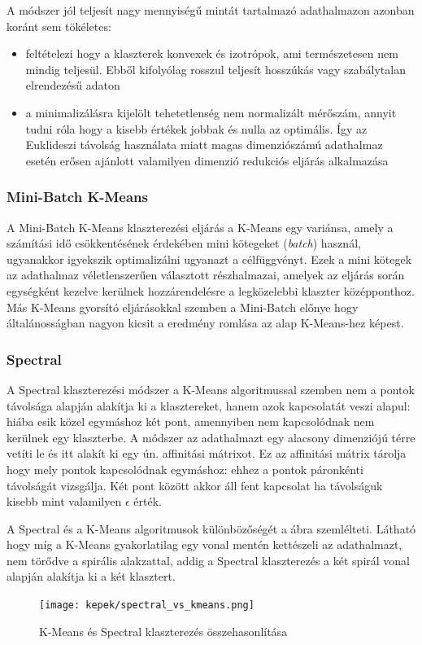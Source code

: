 A módszer jól teljesít nagy mennyiségű mintát tartalmazó adathalmazon azonban koránt sem tökéletes:
\begin{itemize}
	\item feltételezi hogy a klaszterek konvexek és izotrópok, ami természetesen nem mindig teljesül. Ebből kifolyólag rosszul teljesít hosszúkás vagy szabálytalan elrendezésű adaton
	\item a minimalizálásra kijelölt tehetetlenség nem normalizált mérőszám, annyit tudni róla hogy a kisebb értékek jobbak és nulla az optimális. Így az Euklideszi távolság használata miatt magas dimenziószámú adathalmaz esetén erősen ajánlott valamilyen dimenzió redukciós eljárás alkalmazása
\end{itemize}


\subsubsection{Mini-Batch K-Means }
A Mini-Batch K-Means klaszterezési eljárás a K-Means egy variánsa, amely a számítási idő csökkentésének érdekében mini kötegeket (\textit{batch}) használ, ugyanakkor igyekszik optimalizálni ugyanazt a célfüggvényt. Ezek a mini kötegek az adathalmaz véletlenszerűen választott részhalmazai, amelyek az eljárás során egységként kezelve kerülnek hozzárendelésre a legközelebbi klaszter középponthoz. Más K-Means gyorsító eljárásokkal szemben a Mini-Batch előnye hogy általánosságban nagyon kicsit a eredmény romlása az alap K-Means-hez képest.

\subsubsection{Spectral}
A Spectral klaszterezési módszer \cite{sklearn-spectral} \cite{ml-spectral} a K-Means algoritmussal szemben nem a pontok távolsága alapján alakítja ki a klasztereket, hanem azok kapcsolatát veszi alapul: hiába esik közel egymáshoz két pont, amennyiben nem kapcsolódnak nem kerülnek egy klaszterbe. A módszer az adathalmazt egy alacsony dimenziójú térre vetíti le és itt alakít ki egy ún. affinitási mátrixot. Ez az affinitási mátrix tárolja hogy mely pontok kapcsolódnak egymáshoz: ehhez a pontok páronkénti távolságát vizsgálja. Két pont között akkor áll fent kapcsolat ha távolságuk kisebb mint valamilyen $\epsilon$ érték.

A Spectral és a K-Means algoritmusok különbözőségét a  ábra szemlélteti. Látható hogy míg a K-Means gyakorlatilag egy vonal mentén kettészeli az adathalmazt, nem törődve a spirális alakzattal, addig a Spectral klaszterezés a két spirál vonal alapján alakítja ki a két klasztert.
\begin{figure}
	\centering
	\texttt{[image: kepek/spectral\_vs\_kmeans.png]}
	\caption{K-Means és Spectral klaszterezés összehasonlítása \cite{ml-spectral-vs-kmeans-img}}
	\label{fig:spectralVSKmeans}
\end{figure}

